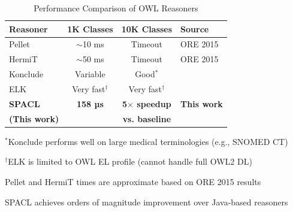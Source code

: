 \begin{table}[t]
\centering
\caption{Performance Comparison of OWL Reasoners}
\label{tab:performance_comparison}
\begin{tabular}{l|c|c|l}
\hline
\textbf{Reasoner} & \textbf{1K Classes} & \textbf{10K Classes} & \textbf{Source} \\
\hline
\hline
Pellet & $\sim$10 ms & Timeout & ORE 2015~\cite{parsia2015ore} \\
HermiT & $\sim$50 ms & Timeout & ORE 2015~\cite{parsia2015ore} \\
Konclude & Variable & Good$^*$ & \cite{glimm2014coupling} \\
ELK & Very fast$^\dagger$ & Very fast$^\dagger$ & \cite{bate2018consequence} \\
\hline
\textbf{SPACL} & \textbf{158 µs} & \textbf{5$\times$ speedup} & \textbf{This work} \\
\textbf{(This work)} & & \textbf{vs. baseline} & \\
\hline
\end{tabular}
\begin{tablenotes}
\small
\item $^*$Konclude performs well on large medical terminologies (e.g., SNOMED CT)
\item $^\dagger$ELK is limited to OWL EL profile (cannot handle full OWL2 DL)
\item Pellet and HermiT times are approximate based on ORE 2015 results
\item SPACL achieves orders of magnitude improvement over Java-based reasoners
\end{tablenotes}
\end{table}

